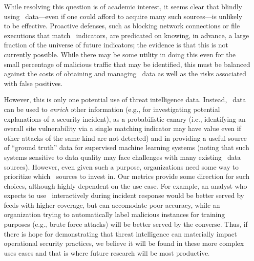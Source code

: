 While resolving this question is of academic interest, it seems clear
that blindly using \ti\ data---even if one could afford to acquire
many such sources---is unlikely to be effective.  Proactive defenses,
such as blocking network connections or file executions that match
\ti\ indicators, are predicated on knowing, in advance, a large
fraction of the universe of future indicators; the evidence is that
this is not currently possible.  While there may be some utility in
doing this even for the small percentage of malicious traffic that may
be identified, this must be balanced against the costs of obtaining
and managing \ti\ data as well as the risks associated with false
positives.

However, this is only one potential use of threat intelligence data.
Instead, \ti\ data can be used to \emph{enrich} other information
(e.g., for investigating potential explanations of a security
incident), as a probabilistic canary (i.e., identifying an overall
site vulnerability via a single matching indicator may have value even
if other attacks of the same kind are not detected) and in providing a
useful source of ``ground truth'' data for supervised machine learning
systems (noting that such systems sensitive to data quality may face
challenges with many existing \ti\ data sources).  However, even given
such a purpose, organizations need some way to prioritize which
\ti\ sources to invest in.  Our metrics provide some direction for
such choices, although highly dependent on the use case. For example,
an analyst who expects to use \ti\ interactively during incident
response would be better served by feeds with higher coverage, but can
accomodate poor accuracy, while an organization trying to
automatically label malicious instances for training purposes (e.g.,
brute force attacks) will be better served by the converse.  Thus, if
there is hope for demonstrating that threat intelligence can
materially impact operational security practices, we believe it will
be found in these more complex uses cases and that is where future
research will be most productive.
